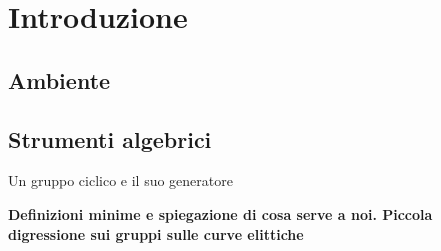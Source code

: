 \chapter{Introduzione}
\section{Ambiente}




 





\section{Strumenti algebrici}
\begin{defi}
Un gruppo ciclico e il suo generatore
\end{defi}
\textbf{Definizioni minime e spiegazione di cosa serve a noi. Piccola digressione sui gruppi sulle curve elittiche}

